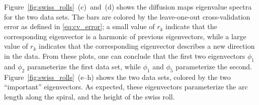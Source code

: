 \documentclass[preprint]{elsarticle}
\begin{document}
Figure~\ref{fig:swiss_rolls}~(c)~and~(d) shows the diffusion maps eigenvalue spectra for the two data sets.
%
The bars are colored by the leave-one-out cross-validation error as defined in \eqref{eq:cv_error}; a small value of $r_k$ indicate that the corresponding eigenvector is a harmonic of previous eigenvectors, while a large value of $r_k$ indicates that the corresponding eigenvector describes a new direction in the data. 
%
From these plots, one can conclude that the first two eigenvectors $\phi_1$ and $\phi_2$ parameterize the first data set, while $\phi_1$ and $\phi_5$ parameterize the second. 
%
Figure~\ref{fig:swiss_rolls}~(e--h) shows the two data sets, colored by the two ``important'' eigenvectors. 
%
As expected, these eigenvectors parameterize the arc length along the spiral, and the height of the swiss roll. 
\end{document}
